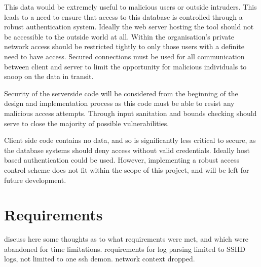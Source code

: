 This data would be extremely useful to malicious users or outside intruders. 
This leads to a need to ensure that access to this database is controlled through a robust authentication system.
Ideally the web server hosting the tool should not be accessible to the outside world at all. Within the organisation's private network access should be restricted tightly to only those users with a definite need to have access. 
Secured connections must be used for all communication between client and server to limit the opportunity for malicious individuals to snoop on the data in transit.

Security of the serverside code will be considered from the beginning of the design and implementation process as this code must be able to resist any malicious access attempts. Through input sanitation and bounds checking should serve to close the majority of possible vulnerabilities.

Client side code contains no data, and so is significantly less critical to secure, as the database systems should deny access without valid credentials. Ideally host based authentication could be used. However, implementing a robust access control scheme does not fit within the scope of this project, and will be left for future development.

\section{Requirements}
discuss here some thoughts as to what requirements were met, and which were abandoned for time limitations.
requirements for log parsing limited to SSHD logs, not limited to one ssh demon.
network context dropped.




